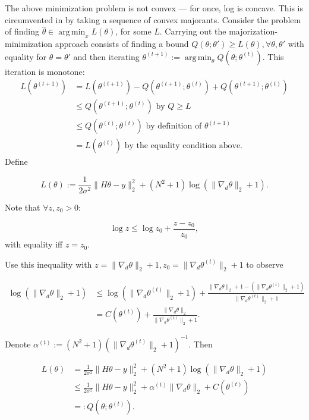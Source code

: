 \documentclass[paper=a4, fontsize=11pt]{scrartcl} %
\DeclareMathOperator*{\argmin}{arg\,min}
\numberwithin{equation}{section} %
\numberwithin{figure}{section} %
\numberwithin{table}{section} %
\newcommand{\grad}{\nabla_{d} }
\begin{document}
The above minimization problem is not convex --- for once, log is
concave.  This is circumvented in \cite{oliveira2009adaptive} by
taking a sequence of convex majorants.  Consider the problem of
finding $\hat{\theta} \in \argmin_{x} L(\theta)$, for some
$L$. Carrying out the majorization-minimization approach consists of
finding a bound $Q(\theta; \theta') \geq L(\theta), \forall
\theta,\theta'$ with equality for $\theta=\theta'$ and then iterating
$\theta^{(t+1)} := \argmin_{\theta} Q(\theta;\theta^{(t)})$. This
iteration is monotone:
\begin{align*}
  L(\theta^{(t+1)}) &= L(\theta^{(t+1)}) - Q(\theta^{(t+1)}; \theta^{(t)}) + Q(\theta^{(t+1)}; \theta^{(t)})\\
  &\leq  Q(\theta^{(t+1)}; \theta^{(t)}) \text{ by } Q \geq L \\
  & \leq Q(\theta^{(t)} ;\theta^{(t)}) \text{ by definition of } \theta^{(t+1)} \\
  &= L(\theta^{(t)}) \text{ by the equality condition above. }
\end{align*}
Define 

$$
L(\theta) :=\frac{1}{2\sigma^2} \|H\theta - y\|_2^2 + (N^2 + 1) \log (\|\grad\theta\|_2 + 1).
$$

Note that $\forall z,z_0 > 0$:

$$
\log z \leq \log z_0 + \frac{z-z_0}{z_0},
$$ 
with equality iff $z = z_0$.

Use this inequality with $z = \|\grad\theta\|_2 + 1, z_0 = \|\grad
\theta^{(t)}\|_2 + 1$ to observe

\begin{align*}
  \log (\|\grad\theta\|_2 + 1) &\leq \log( \|\grad \theta^{(t)}\|_2 + 1 ) + 
  \frac{ \|\grad \theta\|_2 + 1 - (\|\grad \theta^{(t)}\|_2 + 1)}{\|\grad \theta^{(t)}\|_2 + 1} \\
  &= C(\theta^{(t)}) + \frac{ \|\grad \theta\|_2 }{\|\grad \theta^{(t)}\|_2 + 1}.
\end{align*}

Denote $\alpha^{(t)} := (N^2+1)( \|\grad\theta^{(t)} \|_2 + 1 )^{-1}$. Then

\begin{align*}
  L(\theta) &= \frac{1}{2\sigma^2} \|H\theta - y\|_2^2 + (N^2 + 1) \log (\|\grad\theta\|_2 + 1) \\ 
  &\leq \frac{1}{2\sigma^2} \|H\theta - y\|_2^2 + \alpha^{(t)} \|\grad \theta\|_2   + C(\theta^{(t)})\\
  &=: Q(\theta ; \theta^{(t)}).
\end{align*}
\end{document}
